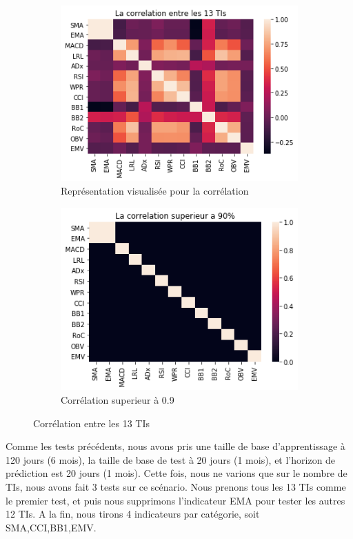 \begin{figure}[H]
	\centering
	\begin{subfigure}{.5\textwidth}
	\includegraphics[width=.9\linewidth, scale=0.2]
	{plot/Corr.png}
	\caption{Représentation visualisée pour la corrélation}
	\label{fig:corr}
	\end{subfigure}%
	\begin{subfigure}{.5\textwidth}
	\centering
	\includegraphics[width=.9\linewidth, scale=0.2]
	{plot/corr_s.png}
	\caption{Corrélation superieur à 0.9}
	\label{fig:corr_s}
	\end{subfigure}
\caption{Corrélation entre les 13 TIs}
\label{fig:correlation}
\end{figure}

Comme les tests précédents, nous avons pris une taille de base d'apprentissage à 120 jours (6 mois), la taille de base de test à 20 jours (1 mois), et l'horizon de prédiction est 20 jours (1 mois). Cette fois, nous ne varions que sur le nombre de TIs, nous avons fait 3 tests sur ce scénario. Nous prenons tous les 13 TIs comme le premier test, et puis nous supprimons l'indicateur EMA pour tester les autres 12 TIs. A la fin, nous tirons 4 indicateurs par catégorie, soit SMA,CCI,BB1,EMV. \\

